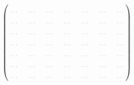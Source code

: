 \documentclass[margin=1mm]{standalone}
\newcommand{\gap}{\textcolor{gray!50}{\dotuline{\hspace{1.5em}}}}
\begin{document}
	$\begin{pmatrix}
			\gap & \gap & \gap & \gap & \gap & \gap & \gap \\
			\gap & \gap & \gap & \gap & \gap & \gap & \gap \\
			\gap & \gap & \gap & \gap & \gap & \gap & \gap \\
			\gap & \gap & \gap & \gap & \gap & \gap & \gap \\
			\gap & \gap & \gap & \gap & \gap & \gap & \gap \\
			\gap & \gap & \gap & \gap & \gap & \gap & \gap \\
			\gap & \gap & \gap & \gap & \gap & \gap & \gap 
		\end{pmatrix}
	$
\end{document}

